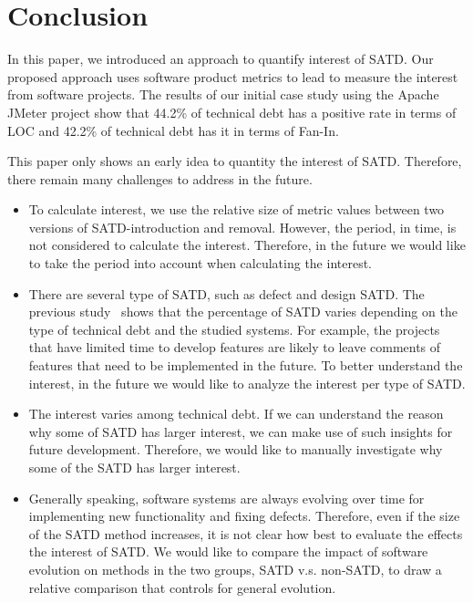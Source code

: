 \section{Conclusion} \label{conclusion}
%
In this paper, we introduced an approach to quantify interest of SATD. Our proposed approach uses
software product metrics to lead to measure the interest from software projects. The results of our initial case study using the Apache JMeter project
show that 44.2\% of technical debt has a positive rate in terms of LOC and 42.2\% of technical debt has it in terms of Fan-In.

 This paper only shows an early idea to quantity the interest of SATD. Therefore, there remain
many challenges to address in the future. 

\begin{itemize}
\item To calculate interest, we use the relative size of metric values between two versions of SATD-introduction and removal. However, the period, in time, is not considered to calculate the interest. Therefore, in the future we would like to take the period into account when calculating the interest.
\item  There are several type of SATD, such as defect and design SATD.
The previous study~\cite{Maldonado2015MTD} shows that the percentage of SATD varies depending on the type of technical debt and the studied systems. For example, the projects that have limited time to develop features are likely to leave comments of features that need to be implemented in the future. 
To better understand the interest, in the future we would like to analyze the interest per type of SATD.
\item  The interest varies among technical debt. If we can understand the reason why some of SATD has larger interest, we can make use of such insights for future development. Therefore, we would like to manually investigate why some of the SATD has larger interest.
\item Generally speaking, software systems are always evolving over time for implementing new functionality and fixing defects.
Therefore, even if the size of the SATD method increases, it is not clear how best to evaluate the effects  the interest of SATD.
We would like to compare the impact of software evolution on methods in the two groups, SATD v.s. non-SATD, to draw a relative comparison that controls for general evolution.
\end{itemize}
